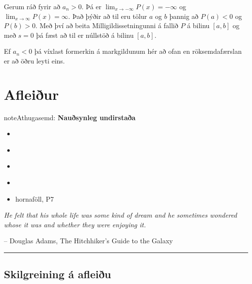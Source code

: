 \documentclass[a4paper,10pt,icelandic]{sphinxmanual}
\begin{document}
Gerum ráð fyrir að \(a_n>0\). Þá er
\(\lim_{x\to -\infty} P(x) = -\infty\) og
\(\lim_{x\to \infty} P(x) = \infty\). Það þýðir að til eru tölur
\(a\) og \(b\) þannig að \(P(a)<0\) og \(P(b)>0\). Með
því að beita Milligildissetningunni á fallið \(P\) á bilinu
\([a,b]\) og með \(s=0\) þá fæst að til er núllstöð á bilinu
\([a,b]\).

Ef \(a_n < 0\) þá víxlast formerkin á markgildunum hér að ofan en röksemdafærslan er
að öðru leyti eins.


\chapter{Afleiður}
\label{kafli03:afleiur}\label{kafli03::doc}
\begin{notice}{note}{Athugasemd:}
\textbf{Nauðsynleg undirstaða}
\begin{itemize}
\item {} 
{\hyperref[kafli02:markgildi]{}}

\item {} 
{\hyperref[kafli02:samfelldni]{}}

\item {} 
{\hyperref[kafli01:samskeyting]{}}

\item {} 
{\hyperref[kafli01:andhverfa]{}}

\item {} 
hornaföll, P7

\end{itemize}
\end{notice}

\emph{He felt that his whole life was some kind of dream and he sometimes wondered whose it was and whether they were enjoying it.}

-- Douglas Adams, The Hitchhiker's Guide to the Galaxy


\bigskip\hrule{}\bigskip



\section{Skilgreining á afleiðu}
\label{kafli03:skilgreining-a-afleiu}\label{kafli03:index-0}\label{kafli03:afleidur}
\end{document}
